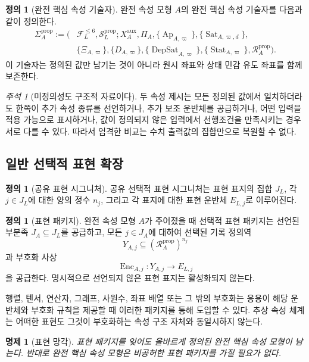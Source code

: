 \documentclass[11pt]{article}
\newcommand{\FVI}{\mathcal F_{L}^{\le 6}}
\newcommand{\Sprop}{\mathcal S_{L}^{\mathrm{prop}}}
\newcommand{\Ap}{\operatorname{Ap}}
\newcommand{\DepSat}{\operatorname{DepSat}}
\newcommand{\Sat}{\operatorname{Sat}}
\newcommand{\Stat}{\operatorname{Stat}}
\newcommand{\PropRec}{\mathcal R^{\mathrm{prop}}}
\newcommand{\Enc}{\operatorname{Enc}}
\newtheorem{proposition}[theorem]{명제}
\theoremstyle{definition}
\newtheorem{definition}[theorem]{정의}
\theoremstyle{remark}
\newtheorem{remark}[theorem]{주석}
\begin{document}
\begin{definition}[완전 핵심 속성 기술자]
\label{def:descriptor}
완전 속성 모형 \(A\)의 완전 핵심 속성 기술자를 다음과 같이 정의한다.
\[
\begin{aligned}
\Sigma_A^{\mathrm{prop}}:=\bigl(&\FVI,\Sprop;
X_A^{\mathrm{aux}},\Pi_A,
\{\Ap_{A,\varpi}\},\{\Sat_{A,\varpi,d}\},\\
&\{\Xi_{A,\varpi}\},\{D_{A,\varpi}\},
\{\DepSat_{A,\varpi}\},\{\Stat_{A,\varpi}\},\PropRec_A\bigr).
\end{aligned}
\]
이 기술자는 정의된 값만 남기는 것이 아니라 원시 좌표와 상태 민감 유도 좌표를 함께 보존한다.
\end{definition}

\begin{remark}[미정의성도 구조적 자료이다]
두 속성 제시는 모든 정의된 값에서 일치하더라도 한쪽이 추가 속성 종류를 선언하거나, 추가 보조 운반체를 공급하거나, 어떤 입력을 적용 가능으로 표시하거나, 값이 정의되지 않은 입력에서 선행조건을 만족시키는 경우 서로 다를 수 있다.
따라서 엄격한 비교는 수치 출력값의 집합만으로 복원할 수 없다.
\end{remark}

\subsection{일반 선택적 표현 확장}

\begin{definition}[공유 표현 시그니처]
공유 선택적 표현 시그니처는 표현 표지의 집합 \(J_L\), 각 \(j\in J_L\)에 대한 양의 정수 \(n_j\), 그리고 각 표지에 대한 표현 운반체 \(E_{L,j}\)로 이루어진다.
\end{definition}

\begin{definition}[표현 패키지]
완전 속성 모형 \(A\)가 주어졌을 때 선택적 표현 패키지는 선언된 부분족 \(J_A\subseteq J_L\)를 공급하고, 모든 \(j\in J_A\)에 대하여 선택된 기록 정의역
\[
Y_{A,j}\subseteq(\PropRec_A)^{n_j}
\]
과 부호화 사상
\[
\Enc_{A,j}:Y_{A,j}\longrightarrow E_{L,j}
\]
을 공급한다.
명시적으로 선언되지 않은 표현 표지는 활성화되지 않는다.
\end{definition}

행렬, 텐서, 연산자, 그래프, 사원수, 좌표 배열 또는 그 밖의 부호화는 응용이 해당 운반체와 부호화 규칙을 제공할 때 이러한 패키지를 통해 도입할 수 있다.
추상 속성 체계는 어떠한 표현도 그것이 부호화하는 속성 구조 자체와 동일시하지 않는다.

\begin{proposition}[표현 망각]
표현 패키지를 잊어도 올바르게 정의된 완전 핵심 속성 모형이 남는다.
반대로 완전 핵심 속성 모형은 비공허한 표현 패키지를 가질 필요가 없다.
\end{proposition}
\end{document}
